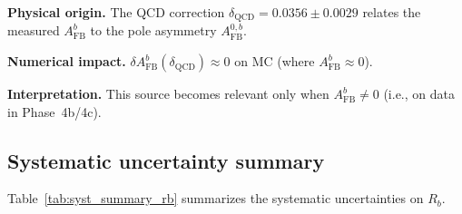 \documentclass[11pt,a4paper]{article}
\begin{document}
\textbf{Physical origin.} The QCD correction $\delta_\mathrm{QCD} = 0.0356 \pm 0.0029$
relates the measured $A_\mathrm{FB}^b$ to the pole asymmetry $A_\mathrm{FB}^{0,b}$.

\textbf{Numerical impact.}
$\delta A_\mathrm{FB}^b(\delta_\mathrm{QCD}) \approx 0$ on MC (where $A_\mathrm{FB}^b \approx 0$).

\textbf{Interpretation.} This source becomes relevant only when $A_\mathrm{FB}^b \neq 0$
(i.e., on data in Phase~4b/4c).

\subsection{Systematic uncertainty summary}
\label{sec:syst_summary}

Table~\ref{tab:syst_summary_rb} summarizes the systematic uncertainties on $R_b$.
\end{document}
